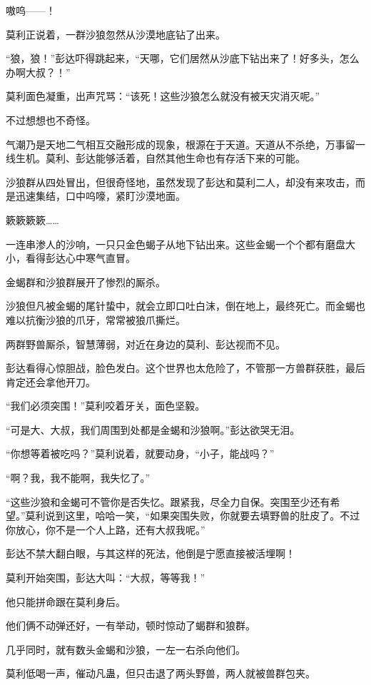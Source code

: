 \begin{this_body}
嗷呜——！

莫利正说着，一群沙狼忽然从沙漠地底钻了出来。

“狼，狼！”彭达吓得跳起来，“天哪，它们居然从沙底下钻出来了！好多头，怎么办啊大叔？！”

莫利面色凝重，出声咒骂：“该死！这些沙狼怎么就没有被天灾消灭呢。”

不过想想也不奇怪。

气潮乃是天地二气相互交融形成的现象，根源在于天道。天道从不杀绝，万事留一线生机。莫利、彭达能够活着，自然其他生命也有存活下来的可能。

沙狼群从四处冒出，但很奇怪地，虽然发现了彭达和莫利二人，却没有来攻击，而是迅速集结，口中呜嚎，紧盯沙漠地面。

簌簌簌簌……

一连串渗人的沙响，一只只金色蝎子从地下钻出来。这些金蝎一个个都有磨盘大小，看得彭达心中寒气直冒。

金蝎群和沙狼群展开了惨烈的厮杀。

沙狼但凡被金蝎的尾针蛰中，就会立即口吐白沫，倒在地上，最终死亡。而金蝎也难以抗衡沙狼的爪牙，常常被狼爪撕烂。

两群野兽厮杀，智慧薄弱，对近在身边的莫利、彭达视而不见。

彭达看得心惊胆战，脸色发白。这个世界也太危险了，不管那一方兽群获胜，最后肯定还会拿他开刀。

“我们必须突围！”莫利咬着牙关，面色坚毅。

“可是大、大叔，我们周围到处都是金蝎和沙狼啊。”彭达欲哭无泪。

“你想等着被吃吗？”莫利说着，就要动身，“小子，能战吗？”

“啊？我，我不能啊，我失忆了。”

“这些沙狼和金蝎可不管你是否失忆。跟紧我，尽全力自保。突围至少还有希望。”莫利说到这里，哈哈一笑，“如果突围失败，你就要去填野兽的肚皮了。不过你放心，你不是一个人上路，还有大叔我呢。”

彭达不禁大翻白眼，与其这样的死法，他倒是宁愿直接被活埋啊！

莫利开始突围，彭达大叫：“大叔，等等我！”

他只能拼命跟在莫利身后。

他们俩不动弹还好，一有举动，顿时惊动了蝎群和狼群。

几乎同时，就有数头金蝎和沙狼，一左一右杀向他们。

莫利低喝一声，催动凡蛊，但只击退了两头野兽，两人就被兽群包夹。


\end{this_body}
